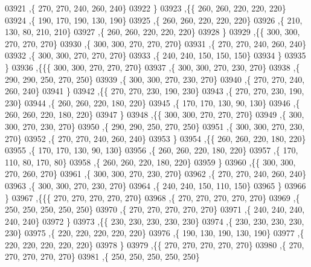 \begin{DoxyCode}
03921     ,\{   270,   270,   240,   260,   240\}
03922     \}
03923    ,\{\{   260,   260,   220,   220,   220\}
03924     ,\{   190,   170,   190,   130,   190\}
03925     ,\{   260,   260,   220,   220,   220\}
03926     ,\{   210,   130,    80,   210,   210\}
03927     ,\{   260,   260,   220,   220,   220\}
03928     \}
03929    ,\{\{   300,   300,   270,   270,   270\}
03930     ,\{   300,   300,   270,   270,   270\}
03931     ,\{   270,   270,   240,   260,   240\}
03932     ,\{   300,   300,   270,   270,   270\}
03933     ,\{   240,   240,   150,   150,   150\}
03934     \}
03935    \}
03936   ,\{\{\{   300,   300,   270,   270,   270\}
03937     ,\{   300,   300,   270,   230,   270\}
03938     ,\{   290,   290,   250,   270,   250\}
03939     ,\{   300,   300,   270,   230,   270\}
03940     ,\{   270,   270,   240,   260,   240\}
03941     \}
03942    ,\{\{   270,   270,   230,   190,   230\}
03943     ,\{   270,   270,   230,   190,   230\}
03944     ,\{   260,   260,   220,   180,   220\}
03945     ,\{   170,   170,   130,    90,   130\}
03946     ,\{   260,   260,   220,   180,   220\}
03947     \}
03948    ,\{\{   300,   300,   270,   270,   270\}
03949     ,\{   300,   300,   270,   230,   270\}
03950     ,\{   290,   290,   250,   270,   250\}
03951     ,\{   300,   300,   270,   230,   270\}
03952     ,\{   270,   270,   240,   260,   240\}
03953     \}
03954    ,\{\{   260,   260,   220,   180,   220\}
03955     ,\{   170,   170,   130,    90,   130\}
03956     ,\{   260,   260,   220,   180,   220\}
03957     ,\{   170,   110,    80,   170,    80\}
03958     ,\{   260,   260,   220,   180,   220\}
03959     \}
03960    ,\{\{   300,   300,   270,   260,   270\}
03961     ,\{   300,   300,   270,   230,   270\}
03962     ,\{   270,   270,   240,   260,   240\}
03963     ,\{   300,   300,   270,   230,   270\}
03964     ,\{   240,   240,   150,   110,   150\}
03965     \}
03966    \}
03967   ,\{\{\{   270,   270,   270,   270,   270\}
03968     ,\{   270,   270,   270,   270,   270\}
03969     ,\{   250,   250,   250,   250,   250\}
03970     ,\{   270,   270,   270,   270,   270\}
03971     ,\{   240,   240,   240,   240,   240\}
03972     \}
03973    ,\{\{   230,   230,   230,   230,   230\}
03974     ,\{   230,   230,   230,   230,   230\}
03975     ,\{   220,   220,   220,   220,   220\}
03976     ,\{   190,   130,   190,   130,   190\}
03977     ,\{   220,   220,   220,   220,   220\}
03978     \}
03979    ,\{\{   270,   270,   270,   270,   270\}
03980     ,\{   270,   270,   270,   270,   270\}
03981     ,\{   250,   250,   250,   250,   250\}

\end{DoxyCode}
